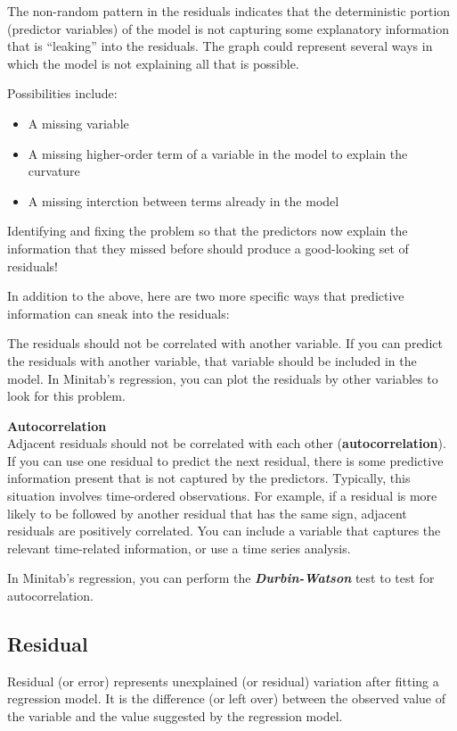 \documentclass[12pt, a4paper]{report}
\theoremstyle{plain}
\theoremstyle{definition}
\theoremstyle{remark}
\begin{document}
The non-random pattern in the residuals indicates that the deterministic portion (predictor variables) of the model is not capturing some explanatory information that is “leaking” into the residuals. The graph could represent several ways in which the model is not explaining all that is possible. 

Possibilities include:

\begin{itemize}
	\item A missing variable
	\item A missing higher-order term of a variable in the model to explain the curvature
	\item A missing interction between terms already in the model
\end{itemize}


Identifying and fixing the problem so that the predictors now explain the information that they missed before should produce a good-looking set of residuals!

In addition to the above, here are two more specific ways that predictive information can sneak into the residuals:

The residuals should not be correlated with another variable. If you can predict the residuals with another variable, that variable should be included in the model. In Minitab’s regression, you can plot the residuals by other variables to look for this problem.

\noindent \textbf{Autocorrelation} \\
Adjacent residuals should not be correlated with each other (\textbf{autocorrelation}). If you can use one residual to predict the next residual, there is some predictive information present that is not captured by the predictors. Typically, this situation involves time-ordered observations. For example, if a residual is more likely to be followed by another residual that has the same sign, adjacent residuals are positively correlated. You can include a variable that captures the relevant time-related information, or use a time series analysis. 

In Minitab’s regression, you can perform the \textbf{\textit{Durbin-Watson} }test to test for autocorrelation.
\newpage
\subsection{Residual}
Residual (or error) represents unexplained (or residual) variation after fitting a regression model. It is the difference (or left over) between the observed value of the variable and the value suggested by the regression model.
\end{document}
